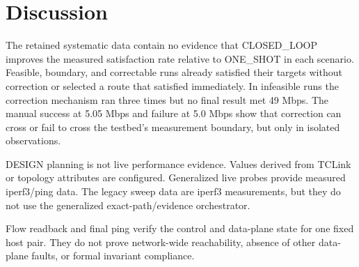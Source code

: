 \documentclass[conference]{IEEEtran}
\begin{document}
\section{Discussion}
The retained systematic data contain no evidence that CLOSED\_LOOP improves
the measured satisfaction rate relative to ONE\_SHOT in each scenario.
Feasible, boundary, and correctable runs already satisfied their targets
without correction or selected a route that satisfied immediately. In
infeasible runs the correction mechanism ran three times but no final result
met 49 Mbps. The manual success at 5.05 Mbps and failure at 5.0 Mbps show
that correction can cross or fail to cross the testbed's measurement boundary,
but only in isolated observations.

DESIGN planning is not live performance evidence. Values derived from
TCLink or topology attributes are configured. Generalized live probes provide
measured iperf3/ping data. The legacy sweep data are iperf3 measurements,
but they do not use the generalized exact-path/evidence orchestrator.

Flow readback and final ping verify the control and data-plane state for one
fixed host pair. They do not prove network-wide reachability, absence of
other data-plane faults, or formal invariant compliance.
\end{document}
